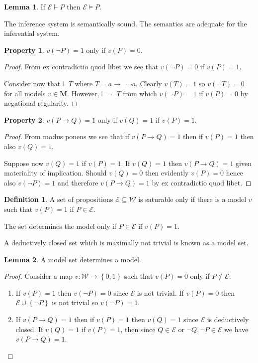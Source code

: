 \documentclass{amsbook}
\newcommand{\setsm}[1]{\left\{#1\right\}}
\newcommand{\wffs}{\mathcal W}
\newcommand{\infers}{\mathrel\vdash}
\newcommand{\theorem}{\mathord\vdash\medspace}
\newcommand{\valids}{\mathrel\vDash}
\newcommand{\then}{\mathrel\rightarrow}
\theoremstyle{definition}
\newtheorem{prop}{Property}[section]
\newtheorem{lmm}{Lemma}[section]
\newtheorem{dfn}{Definition}[section]
\begin{document}
\begin{lmm}
    If $\mathcal E \infers P$ then $\mathcal E \valids P$.

    The inference system is semantically sound. The semantics are adequate for the inferential system.
\end{lmm}

\begin{prop}
    $v(\neg P) = 1$ only if $v(P) = 0$.

    \begin{proof}
        From ex contradictio quod libet we see that $v(\neg P) = 0$ if $v(P) = 1$.

        Consider now that $\theorem T$ where $T = a \then \neg\neg a$. Clearly $v(T) = 1$ so $v(\neg T) = 0$ for all models $v \in \mathbf M$. However, $\theorem \neg\neg T$ from which $v(\neg P) = 1$ if $v(P) = 0$ by negational regularity.
    \end{proof}
\end{prop}

\begin{prop}
    $v(P \then Q) = 1$ only if $v(Q) = 1$ if $v(P) = 1$.
    \begin{proof}
        From modus ponens we see that if $v(P \then Q) = 1$ then if $v(P) = 1$ then also $v(Q) = 1$.

        Suppose now $v(Q) = 1$ if $v(P) = 1$. If $v(Q) = 1$ then $v(P \then Q) = 1$ given materiality of implication. Should $v(Q) = 0$ then evidently $v(P) = 0$ hence also $v(\neg P) = 1$ and therefore $v(P \then Q) = 1$ by ex contradictio quod libet.
    \end{proof}
\end{prop}

\begin{dfn}
    A set of propositions $\mathcal E \subseteq \wffs$ is saturable only if there is a model $v$ such that $v(P) = 1$ if $P \in \mathcal E$.

    The set determines the model only if $P \in \mathcal E$ if $v(P) = 1$.

    A deductively closed set which is maximally not trivial is known as a model set.
\end{dfn}

\begin{lmm}
    A model set determines a model.
    \begin{proof}
        Consider a map $v: \wffs \longrightarrow \setsm{0,1}$ such that $v(P) = 0$ only if $P \notin \mathcal E$.
        \begin{enumerate}
            \item If $v(P) = 1$ then $v(\neg P) = 0$ since $\mathcal E$ is not trivial. If $v(P) = 0$ then $\mathcal E \cup \setsm {\neg P}$ is not trivial so $v(\neg P) = 1$.
            \item If $v(P \then Q) = 1$ then if $v(P) = 1$ then $v(Q) = 1$ since $\mathcal E$ is deductively closed. If $v(Q) = 1$ if $v(P) = 1$, then since $Q \in \mathcal E$ or $\neg Q, \neg P \in \mathcal E$ we have $v(P \then Q) = 1$.
        \end{enumerate}
    \end{proof}
\end{lmm}
\end{document}
